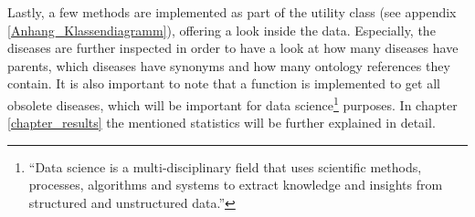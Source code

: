 Lastly, a few methods are implemented as part of the utility class (see appendix \ref{Anhang_Klassendiagramm}), offering a look inside the data. Especially, the diseases are further inspected in order to have a look at how many diseases have parents, which diseases have synonyms and how many ontology references they contain. It is also important to note that a function is implemented to get all obsolete diseases, which will be important for data science\footnote{\enquote{Data science is a multi-disciplinary field that uses scientific methods, processes, algorithms and systems to extract knowledge and insights from structured and unstructured data.}\citep{datascience}} purposes. In chapter \ref{chapter_results} the mentioned statistics will be further explained in detail. 
